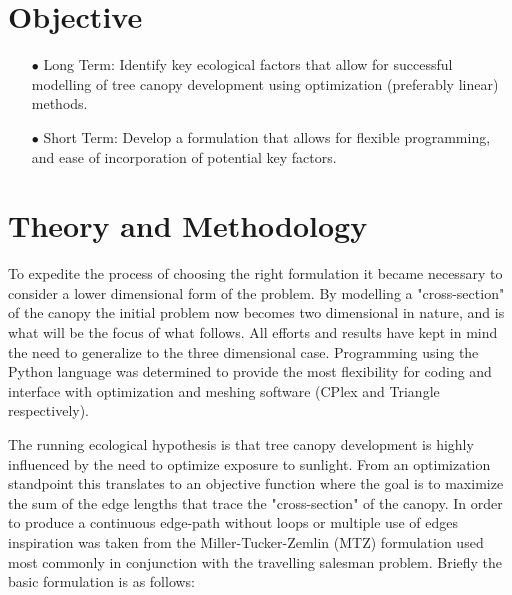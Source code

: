 \documentclass[letterpaper,11pt]{texMemo} %
\begin{document}
\maketitle %


\section{Objective}

\begin{enumerate}
\item[$\bullet$] Long Term: Identify key ecological factors that allow for successful modelling of tree canopy development using optimization (preferably linear) methods. 
\item[$\bullet$] Short Term: Develop a formulation that allows for flexible programming, and ease of incorporation of potential key factors. 
\end{enumerate}


\section{Theory and Methodology}

To expedite the process of choosing the right formulation it became necessary to consider a lower dimensional form of the problem. By modelling a "cross-section" of the canopy the initial problem now becomes two dimensional in nature, and is what will be the focus of what follows. All efforts and results have kept in mind the need to generalize to the three dimensional case. Programming using the Python language was determined to provide the most flexibility for coding and interface with optimization and meshing software (CPlex and Triangle respectively). 

\noindent The running ecological hypothesis is that tree canopy development is highly influenced by the need to optimize exposure to sunlight. From an optimization standpoint this translates to an objective function where the goal is to maximize the sum of the edge lengths that trace the "cross-section" of the canopy. In order to produce a continuous edge-path without loops or multiple use of edges inspiration was taken from the Miller-Tucker-Zemlin (MTZ) formulation used most commonly in conjunction with the travelling salesman problem. Briefly the basic formulation is as follows: 
\end{document}
